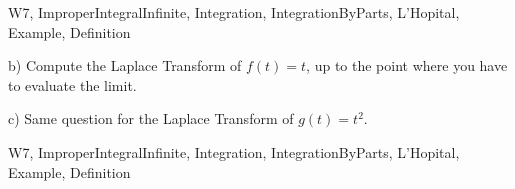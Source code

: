 \begin{tagblock}{W7, ImproperIntegralInfinite, Integration, IntegrationByParts, L'Hopital, Example, Definition}
\begin{question}
\bigskip

b) Compute the Laplace Transform of $f(t)=t$, up to the point where you have to evaluate the limit. 

\bigskip

c) Same question for the Laplace Transform of $g(t)=t^2$.

    
\begin{tags}
       W7, ImproperIntegralInfinite, Integration, IntegrationByParts, L'Hopital, Example, Definition
\end{tags}
    
\begin{diary}
        
\end{diary}
	
\begin{solution}

\end{solution}
	
\end{question}

\end{tagblock}

